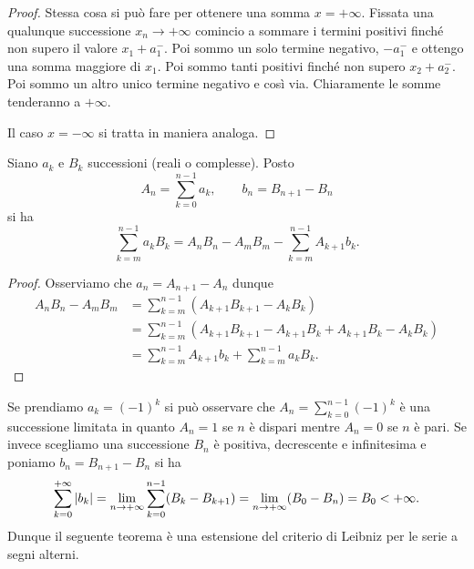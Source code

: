 \begin{proof}
Stessa cosa si può fare per ottenere una somma $x=+\infty$. Fissata una qualunque
successione $x_n \to +\infty$ comincio a sommare i termini positivi finché non supero il valore $x_1+a_1^-$. 
Poi sommo un solo termine negativo, $-a_1^-$ e ottengo una somma maggiore di $x_1$. 
Poi sommo tanti positivi finché non supero $x_2+a_2^-$. 
Poi sommo un altro unico termine negativo e così via. 
Chiaramente le somme tenderanno a $+\infty$.

Il caso $x=-\infty$ si tratta in maniera analoga.
\end{proof}

\begin{theorem}
\label{th:somma_per_parti}%
Siano $a_k$ e $B_k$ successioni (reali o complesse).
Posto
\[
  A_n = \sum_{k=0}^{n-1} a_k, \qquad
  b_n = B_{n+1} - B_n
\]
si ha
%
\begin{equation}\label{eq:somma_per_parti}
 \sum_{k=m}^{n-1} a_k B_k = A_n B_n - A_m B_m - \sum_{k=m}^{n-1} A_{k+1}b_k.
\end{equation}
\end{theorem}
%
\begin{proof}
Osserviamo che $a_n = A_{n+1}-A_n$ dunque
\begin{align*}
  A_n B_n - A_m B_m
  &= \sum_{k=m}^{n-1} (A_{k+1}B_{k+1}-A_k B_k)\\
  &= \sum_{k=m}^{n-1} (A_{k+1}B_{k+1}-A_{k+1}B_k + A_{k+1}B_k - A_k B_k)\\
  &= \sum_{k=m}^{n-1} A_{k+1}b_k + \sum_{k=m}^{n-1} a_k B_k.
\end{align*}
\end{proof}

Se prendiamo $a_k=(-1)^k$ si può osservare che $A_n = \sum_{k=0}^{n-1} (-1)^k$
è una successione limitata in quanto $A_n = 1$ se $n$ è dispari mentre
$A_n=0$ se $n$ è pari.
Se invece scegliamo una successione $B_n$ è positiva,
decrescente e infinitesima
e poniamo $b_n = B_{n+1}-B_n$
si ha
\[
  \sum_{k=0}^{+\infty} {\left|b_k\right|}
  = \lim_{n\to+\infty}\sum_{k=0}^{n-1} (B_k-B_{k+1})
  = \lim_{n\to +\infty} (B_0 - B_n) = B_0 < +\infty.
\]
Dunque il seguente teorema è una estensione del criterio
di Leibniz per le serie a segni alterni.

